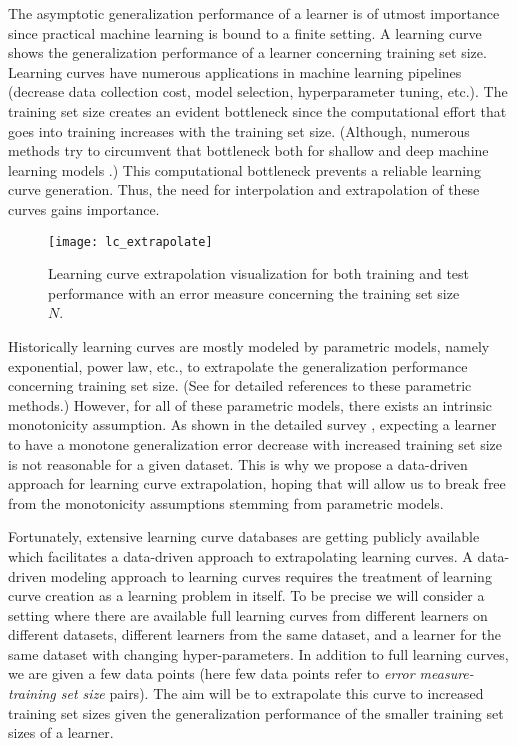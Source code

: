 The asymptotic generalization performance of a learner is of utmost importance since practical machine learning is bound to a finite setting. A learning curve shows the generalization performance of a learner concerning training set size. Learning curves have numerous applications in machine learning pipelines (decrease data collection cost, model selection, hyperparameter tuning, etc.). The training set size creates an evident bottleneck since the computational effort that goes into training increases with the training set size. (Although, numerous methods try to circumvent that bottleneck both for shallow and deep machine learning models \cite{ma2017,kiefer1952}.) This computational bottleneck prevents a reliable learning curve generation. Thus, the need for interpolation and extrapolation of these curves gains importance.

\begin{wrapfigure}{r}{0.5\textwidth}
  \begin{center}
    \texttt{[image: lc\_extrapolate]}
  \end{center}
  \caption{Learning curve extrapolation visualization for both training and test performance  with an error measure concerning the training set size $N$.}
\end{wrapfigure}

Historically learning curves are mostly modeled by parametric models, namely exponential, power law, etc.,  to extrapolate the generalization performance concerning training set size. (See \cite{mohr} for detailed references to these parametric methods.) However, for all of these parametric models, there exists an intrinsic monotonicity assumption. As shown in the detailed survey \cite{looga}, expecting a learner to have a monotone generalization error decrease with increased training set size is not reasonable for a given dataset. This is why we propose a data-driven approach for learning curve extrapolation, hoping that will allow us to break free from the monotonicity assumptions stemming from parametric models. 

Fortunately, extensive learning curve databases are getting publicly available which facilitates a data-driven approach to extrapolating learning curves. A data-driven modeling approach to learning curves requires the treatment of learning curve creation as a learning problem in itself. To be precise we will consider a setting where there are available full learning curves from different learners on different datasets, different learners from the same dataset, and a learner for the same dataset with changing hyper-parameters. In addition to full learning curves, we are given a few data points (here few data points refer to \textit{error measure-training set size} pairs). The aim will be to extrapolate this curve to increased training set sizes given the generalization performance of the smaller training set sizes of a learner. 

